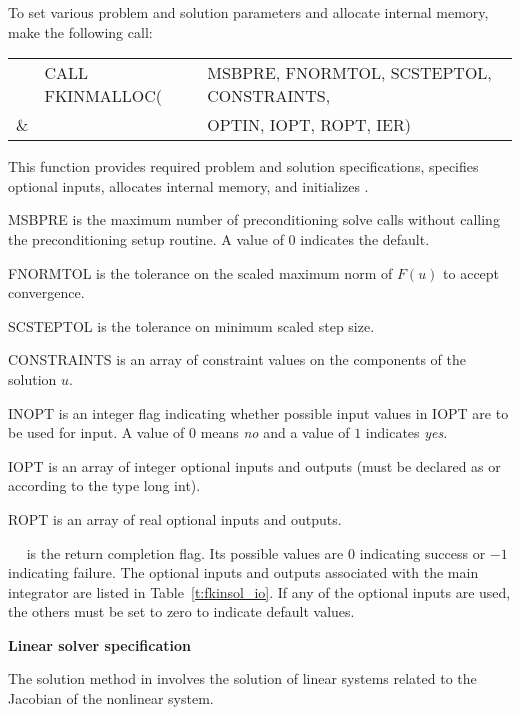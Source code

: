 \begin{Steps}
  To set various problem and solution parameters and allocate
  internal memory, make the following call:
  {
    \begin{tabular}[t]{@{}r@{}l@{}l@{}}
      &CALL FKINMALLOC(&MSBPRE, FNORMTOL, SCSTEPTOL, CONSTRAINTS, \\
    \&&                &OPTIN, IOPT, ROPT, IER)
    \end{tabular}
  }
  {
    This function provides required problem and solution specifications, 
    specifies optional inputs,
    allocates internal memory, and initializes {\kinsol}.
  }
  {
    \begin{args}[CONSTRAINTS\,]
    \item[MSBPRE] is the maximum number of preconditioning solve calls
      without calling the preconditioning setup routine.
      A value of $0$ indicates the default.
    \item[FNORMTOL] is the tolerance on the scaled maximum norm of
      $F(u)$ to accept convergence. 
    \item[SCSTEPTOL] is the tolerance on minimum scaled step size.
    \item[CONSTRAINTS] is an array of constraint values on the components of the
      solution $u$.
    \item[INOPT] is an integer flag indicating whether possible
      input values in IOPT are to be used for input. A value of
      $0$ means {\em no} and a value of $1$ indicates {\em yes}.
    \item[IOPT] is an array of integer optional inputs and outputs
      (must be declared as  or  according to the
      {\C} type long int).
    \item[ROPT] is an array of real optional inputs and outputs.
    \end{args}
  }
  {
    ~~ is the return completion flag. Its possible values are $0$ 
    indicating success or $-1$ indicating failure.
  }
  {
    The optional inputs and outputs associated with the main {\kinsol} integrator
    are listed in Table~\ref{t:fkinsol_io}.
    If any of the optional inputs are used, the others must be set
    to zero to indicate default values.
  }
  
\item\label{i:fkinsol_lin_solv_spec}{\bf Linear solver specification} 
  
  The solution method in {\kinsol} involves the solution of linear systems 
  related to the Jacobian of the nonlinear system.
  

\end{Steps}
